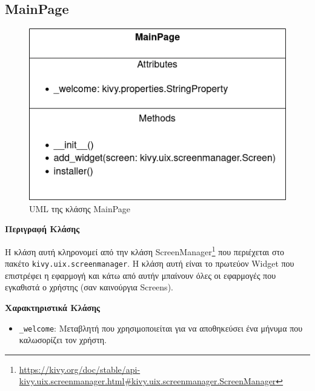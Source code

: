\newpage
\subsection{MainPage}

\begin{figure}[h]
    \centering
    \includegraphics[scale=0.7]{images/chapter4/uml_diagrams/MainPage.png}
    \caption{UML της κλάσης MainPage}
    \label{fig:mainpage}
\end{figure}

\noindent\textbf{Περιγραφή Κλάσης}

Η κλάση αυτή κληρονομεί από την κλάση ScreenManager\footnote{ \href{https://kivy.org/doc/stable/api-kivy.uix.screenmanager.html\#kivy.uix.screenmanager.ScreenManager}{https://kivy.org/doc/stable/api-kivy.uix.screenmanager.html\#kivy.uix.screenmanager.ScreenManager}} που περιέχεται στο πακέτο \texttt{kivy.uix.screenmanager}. Η κλάση αυτή είναι το πρωτεύον Widget που επιστρέφει η εφαρμογή και κάτω από αυτήν μπαίνουν όλες οι εφαρμογές που εγκαθιστά ο χρήστης (σαν καινούργια Screens).

\noindent\textbf{Χαρακτηριστικά Κλάσης}
\begin{itemize}
    \item \texttt{\_welcome}: Μεταβλητή που χρησιμοποιείται για να αποθηκεύσει ένα μήνυμα που καλωσορίζει τον χρήστη.
\end{itemize}

